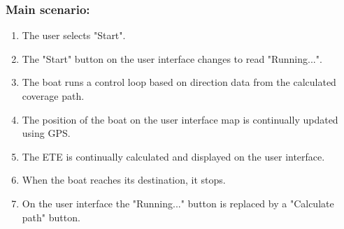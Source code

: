 \begin{framed}
	\subsubsection*{Main scenario:}
	\begin{enumerate}
		\item The user selects "Start".
		\item The "Start" button on the user interface changes to read "Running...".
		\item The boat runs a control loop based on direction data from the calculated coverage path.
		\item The position of the boat on the user interface map is continually updated using GPS.
		\item The ETE is continually calculated and displayed on the user interface.
		\item When the boat reaches its destination, it stops.
		\item On the user interface the "Running..." button is replaced by a "Calculate path" button.
	\end{enumerate}	
\end{framed}	

